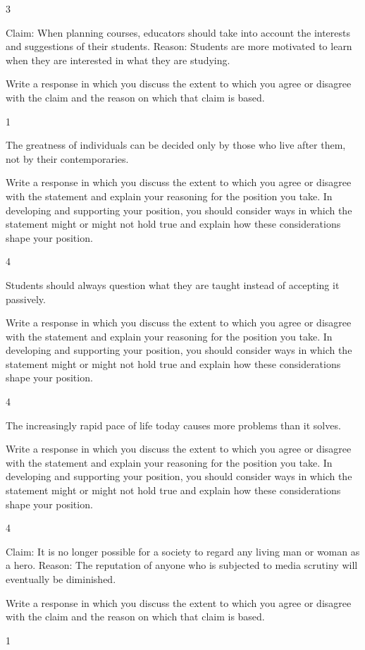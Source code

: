 \documentclass[]{article}
\begin{document}
3

Claim: When planning courses, educators should take into account the
interests and suggestions of their students. Reason: Students are more
motivated to learn when they are interested in what they are studying.

Write a response in which you discuss the extent to which you agree or
disagree with the claim and the reason on which that claim is based.

1

The greatness of individuals can be decided only by those who live after
them, not by their contemporaries.

Write a response in which you discuss the extent to which you agree or
disagree with the statement and explain your reasoning for the position
you take. In developing and supporting your position, you should
consider ways in which the statement might or might not hold true and
explain how these considerations shape your position.

4

Students should always question what they are taught instead of
accepting it passively.

Write a response in which you discuss the extent to which you agree or
disagree with the statement and explain your reasoning for the position
you take. In developing and supporting your position, you should
consider ways in which the statement might or might not hold true and
explain how these considerations shape your position.

4

The increasingly rapid pace of life today causes more problems than it
solves.

Write a response in which you discuss the extent to which you agree or
disagree with the statement and explain your reasoning for the position
you take. In developing and supporting your position, you should
consider ways in which the statement might or might not hold true and
explain how these considerations shape your position.

4

Claim: It is no longer possible for a society to regard any living man
or woman as a hero. Reason: The reputation of anyone who is subjected to
media scrutiny will eventually be diminished.

Write a response in which you discuss the extent to which you agree or
disagree with the claim and the reason on which that claim is based.

1
\end{document}

